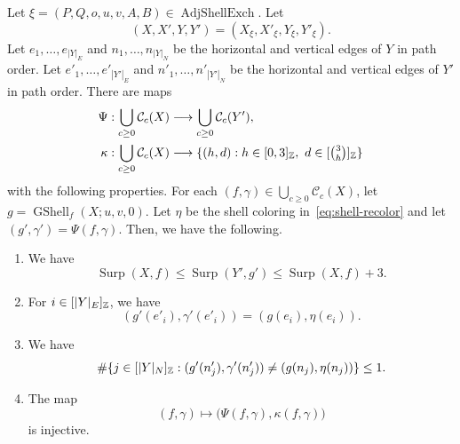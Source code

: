 \begin{lemma}\label{lem:exchange-precursors}
Let $\xi=(P,Q,o,u,v,A,B)\in\operatorname{AdjShellExch}$.
Let
\[
 (X,X',Y,Y')=(X_\xi,X'_\xi,Y_\xi,Y'_\xi).
\]
Let $e_1,\ldots,e_{|Y|_E}$ and $n_1,\ldots,n_{|Y|_N}$ be the horizontal and vertical edges of $Y$ in path order.
Let $e'_1,\ldots,e'_{|Y'|_E}$ and $n'_1,\ldots,n'_{|Y'|_N}$ be the horizontal and vertical edges of $Y'$ in path order.
There are maps
\[
\begin{aligned}
 \Psi&:\bigcup_{c\ge0}\mathcal C_c(X)\longrightarrow
             \bigcup_{c\ge0}\mathcal C_c(Y'),\\
 \kappa&:\bigcup_{c\ge0}\mathcal C_c(X)\longrightarrow
 \{(h,d):h\in[0,3]_{\mathbb Z},\ d\in[\tbinom3h]_{\mathbb Z}\}
\end{aligned}
\]
with the following properties.
For each $(f,\gamma)\in\bigcup_{c\ge0}\mathcal C_c(X)$, let $g=\operatorname{GShell}_{f}(X;u,v,0)$.
Let $\eta$ be the shell coloring in~\eqref{eq:shell-recolor} and let
$(g',\gamma')=\Psi(f,\gamma)$.
Then, we have the following.

\begin{enumerate}
\item\label{c:adjacent-exchange-surplus} We have
\[
 \operatorname{Surp}(X,f)\le\operatorname{Surp}(Y',g')
 \le\operatorname{Surp}(X,f)+3.
\]
\item\label{c:adjacent-exchange-horizontal} For $i\in[|Y|_E]_{\mathbb Z}$, we have
\[
 (g'(e'_i),\gamma'(e'_i))=(g(e_i),\eta(e_i)).
\]
\item\label{c:adjacent-exchange-vertical} We have
\[
 \#\{j\in[|Y|_N]_{\mathbb Z}:(g'(n'_j),\gamma'(n'_j))\ne(g(n_j),\eta(n_j))\}\le1.
\]
\item\label{c:adjacent-exchange-recovery} The map
\[
 (f,\gamma)\longmapsto\bigl(\Psi(f,\gamma),\kappa(f,\gamma)\bigr)
\]
is injective.
\end{enumerate}
\end{lemma}
